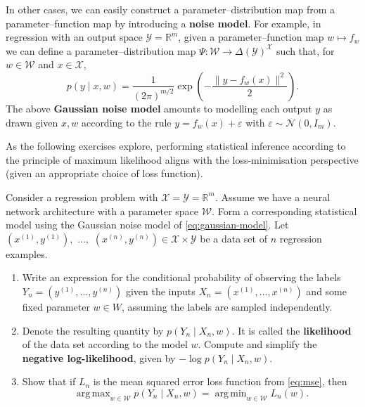 \documentclass[11pt]{article}
\newcommand{\R}{\mathbb{R}}
\DeclareMathOperator*{\argmin}{arg\,min}
\DeclareMathOperator*{\argmax}{arg\,max}
\newcommand{\X}{\mathcal{X}}
\newcommand{\Y}{\mathcal{Y}}
\newcommand{\W}{\mathcal{W}}
\begin{document}
In other cases, we can easily construct a parameter--distribution map from a
parameter--function map by introducing a \textbf{noise model}. For example, in
regression with an output space
    $\Y = \R^m$,
given a parameter--function map $w \mapsto f_w$ we can define a
parameter--distribution map
    $\Psi : \W \to \Delta(\Y)^\X$
such that, for $w\in\W$ and $x\in\X$,
\begin{equation}
\label{eq:gaussian-model}
    p(y \mid x, w) = \frac{1}{(2\pi)^{m/2}} 
    \exp\!\left(-\frac{\|y - f_w(x)\|^2}{2}\right).
\end{equation}
The above \textbf{Gaussian noise model} amounts to modelling each output $y$ as
drawn given $x, w$ according to the rule $y = f_w(x) + \varepsilon$ with
$\varepsilon \sim \mathcal{N}(0, I_m)$.

As the following exercises explore, performing statistical inference according
to the principle of maximum likelihood aligns with the loss-minimisation
perspective (given an appropriate choice of loss function).

\begin{exercise}
    \label{ex:nll-mse}
    Consider a regression problem with $\X = \Y = \R^m$. Assume we have a
    neural network architecture with a parameter space $\W$. Form a
    corresponding statistical model using the Gaussian noise model of
    \eqref{eq:gaussian-model}.
    Let 
        $(x^{(1)}, y^{(1)}),$ $\ldots,$ $(x^{(n)}, y^{(n)}) \in \X \times \Y$
    be a data set of $n$ regression examples. 
\begin{enumerate}
    \item
        Write an expression for the conditional probability of
        observing the labels
            $Y_n = (y^{(1)}, \ldots, y^{(n)})$
        given the inputs
            $X_n = (x^{(1)}, \ldots, x^{(n)})$
        and some fixed parameter $w \in W$, assuming the labels are sampled
        independently.
    \item
        Denote the resulting quantity by
            $p(Y_n \mid X_n, w)$.
        It is called the \textbf{likelihood} of the data set according to the
        model $w$. Compute and simplify the \textbf{negative log-likelihood},
        given by $-\log p(Y_n \mid X_n, w)$.
    \item
        Show that if $L_n$ is the mean squared error loss function from
        \eqref{eq:mse}, then
        $$
            \argmax_{w \in \W} p(Y_n \mid X_n, w)
            =
            \argmin_{w \in \W} L_n(w)
        .$$
\end{enumerate}
\end{exercise}
\end{document}
